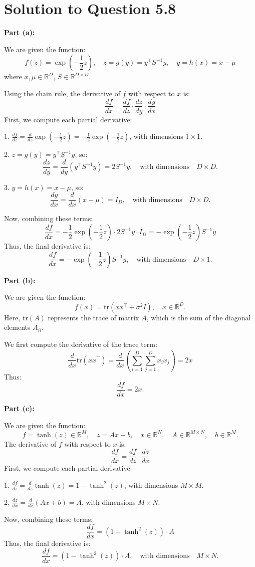 \documentclass[12pt]{article}
\begin{document}
\section*{Solution to Question 5.8}

\textbf{Part (a):}

We are given the function:
\[
f(z) = \exp\left(-\frac{1}{2} z\right), \quad z = g(y) = y^\top S^{-1} y, \quad y = h(x) = x - \mu
\]
where \(x, \mu \in \mathbb{R}^D\), \(S \in \mathbb{R}^{D \times D}\).

Using the chain rule, the derivative of \(f\) with respect to \(x\) is:
\[
\frac{df}{dx} = \frac{df}{dz} \cdot \frac{dz}{dy} \cdot \frac{dy}{dx}
\]
First, we compute each partial derivative:

1. \(\frac{df}{dz} = \frac{d}{dz} \exp\left(-\frac{1}{2} z\right) = -\frac{1}{2} \exp\left(-\frac{1}{2} z\right)\), with dimensions \(1 \times 1\).

2. \(z = g(y) = y^\top S^{-1} y\), so:
\[
\frac{dz}{dy} = \frac{d}{dy} \left( y^\top S^{-1} y \right) = 2 S^{-1} y, \quad \text{with dimensions} \quad D \times D.
\]

3. \(y = h(x) = x - \mu\), so:
\[
\frac{dy}{dx} = \frac{d}{dx} (x - \mu) = I_D, \quad \text{with dimensions} \quad D \times D.
\]

Now, combining these terms:
\[
\frac{df}{dx} = -\frac{1}{2} \exp\left(-\frac{1}{2} z\right) \cdot 2 S^{-1} y \cdot I_D = - \exp\left(-\frac{1}{2} z\right) S^{-1} y
\]
Thus, the final derivative is:
\[
\frac{df}{dx} = - \exp\left(-\frac{1}{2} z\right) S^{-1} y, \quad \text{with dimensions} \quad D \times 1.
\]

\textbf{Part (b):}

We are given the function:
\[
f(x) = \text{tr}(xx^\top + \sigma^2 I), \quad x \in \mathbb{R}^D.
\]
Here, \(\text{tr}(A)\) represents the trace of matrix \(A\), which is the sum of the diagonal elements \(A_{ii}\).

We first compute the derivative of the trace term:
\[
\frac{d}{dx} \text{tr}(xx^\top) = \frac{d}{dx} \left( \sum_{i=1}^D \sum_{j=1}^D x_i x_j \right) = 2x
\]
Thus:
\[
\frac{df}{dx} = 2x.
\]

\textbf{Part (c):}

We are given the function:
\[
f = \tanh(z) \in \mathbb{R}^M, \quad z = Ax + b, \quad x \in \mathbb{R}^N, \quad A \in \mathbb{R}^{M \times N}, \quad b \in \mathbb{R}^M.
\]
The derivative of \(f\) with respect to \(x\) is:
\[
\frac{df}{dx} = \frac{df}{dz} \cdot \frac{dz}{dx}
\]
First, we compute each partial derivative:

1. \(\frac{df}{dz} = \frac{d}{dz} \tanh(z) = 1 - \tanh^2(z)\), with dimensions \(M \times M\).

2. \(\frac{dz}{dx} = \frac{d}{dx}(Ax + b) = A\), with dimensions \(M \times N\).

Now, combining these terms:
\[
\frac{df}{dx} = (1 - \tanh^2(z)) \cdot A
\]
Thus, the final derivative is:
\[
\frac{df}{dx} = (1 - \tanh^2(z)) \cdot A, \quad \text{with dimensions} \quad M \times N.
\]
\end{document}

